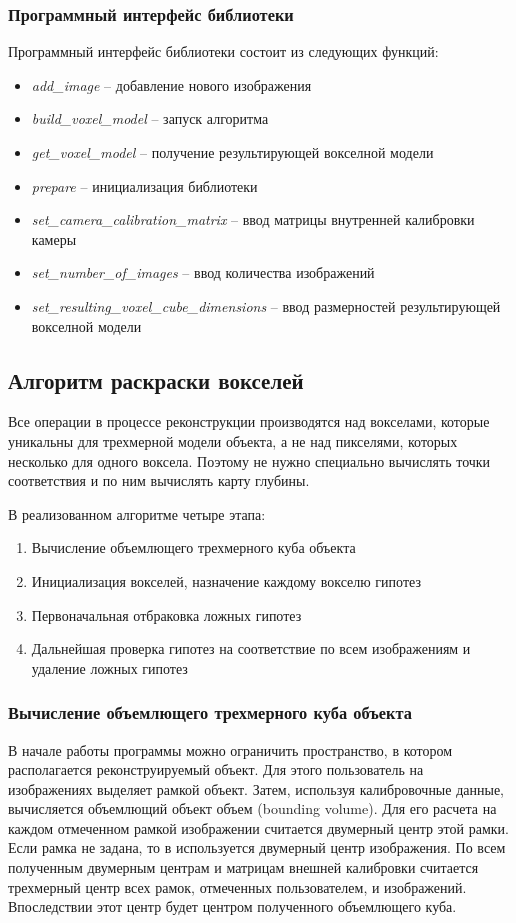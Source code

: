 \subsubsection{Программный интерфейс библиотеки}
Программный интерфейс библиотеки состоит из следующих функций:
\begin{itemize}
\item \textit{add\_image} -- добавление нового изображения
\item \textit{build\_voxel\_model} -- запуск алгоритма
\item \textit{get\_voxel\_model} -- получение результирующей вокселной модели
\item \textit{prepare} -- инициализация библиотеки
\item \textit{set\_camera\_calibration\_matrix} -- ввод матрицы внутренней калибровки камеры
\item \textit{set\_number\_of\_images} -- ввод количества изображений
\item \textit{set\_resulting\_voxel\_cube\_dimensions} -- ввод размерностей результирующей вокселной модели
\end{itemize}

\subsection{Алгоритм раскраски вокселей}
Все операции в процессе реконструкции производятся над вокселами, которые уникальны для трехмерной модели объекта, а не над пикселями, которых несколько для одного воксела. Поэтому не нужно специально вычислять точки соответствия и по ним вычислять карту глубины.

В реализованном алгоритме четыре этапа:
\begin{enumerate}
\item Вычисление объемлющего трехмерного куба объекта
\item Инициализация вокселей, назначение каждому вокселю гипотез
\item Первоначальная отбраковка ложных гипотез
\item Дальнейшая проверка гипотез на соответствие по всем изображениям и  удаление ложных гипотез
\end{enumerate}

\subsubsection{Вычисление объемлющего трехмерного куба объекта}
В начале работы программы можно ограничить пространство, в котором располагается реконструируемый объект. Для этого пользователь на изображениях выделяет рамкой объект. Затем, используя калибровочные данные, вычисляется объемлющий объект объем (bounding volume). Для его расчета на каждом отмеченном рамкой изображении считается двумерный центр этой рамки. Если рамка не задана, то в используется двумерный центр изображения. По всем полученным двумерным центрам и матрицам внешней калибровки считается трехмерный центр всех рамок, отмеченных пользователем, и изображений. Впоследствии этот центр будет центром полученного объемлющего куба.

